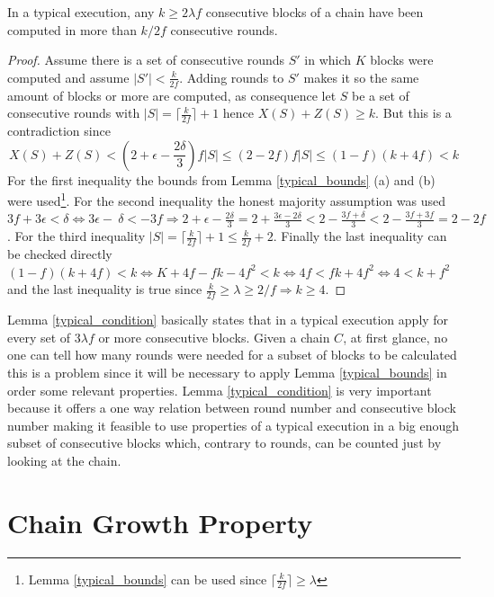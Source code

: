 \documentclass[..]{subfiles}
\begin{document}
\begin{lemma}\label{typical_condition}
	In a typical execution, any $k \ge 2 \lambda f$ consecutive blocks of a chain have been computed in more than $k/2f$ consecutive rounds.
\end{lemma}
\begin{proof}
	Assume there is a set of consecutive rounds $S'$ in which $K$ blocks were computed and assume $|S'|<\frac{k}{2f}$. Adding rounds to $S'$ makes it so the same amount of blocks or more are computed, as consequence let $S$ be a set of consecutive rounds with $|S| = \lceil\frac{k}{2f}\rceil + 1$ hence $X(S) + Z(S) \ge k$. But this is a contradiction since
	$$X(S) + Z(S) < (2 + \epsilon - \frac{2\delta}{3}) f|S| \le (2 - 2f)f|S| \le (1-f)(k+4f) < k$$
	For the first inequality the bounds from Lemma \ref{typical_bounds} (a) and (b) were used\footnote{Lemma \ref{typical_bounds} can be used since $\lceil\frac{k}{2f}\rceil \ge \lambda$}. For the second inequality the honest majority assumption was used $3f + 3\epsilon < \delta \Leftrightarrow 3\epsilon -\ \delta < -3f \Longrightarrow 2 + \epsilon - \frac{2\delta}{3} = 2 + \frac{3\epsilon -2\delta}{3} < 2-\frac{3f + \delta}{3} < 2 - \frac{3f + 3f}{3} = 2 - 2f$. For the third inequality $|S| = \lceil\frac{k}{2f}\rceil + 1 \le \frac{k}{2f} + 2$. Finally the last inequality can be checked directly $(1-f)(k+4f) < k \Leftrightarrow K+4f-fk-4f^2 < k \Leftrightarrow 4f < fk + 4f^2 \Leftrightarrow 4 < k + f^2$ and the last inequality is true since $\frac{k}{2f} \ge \lambda \ge 2/f \Rightarrow k \ge 4$.
\end{proof}

\begin{remark}
	\normalfont
	Lemma \ref{typical_condition} basically states that in a typical execution apply for every set of $3\lambda f$ or more consecutive blocks. Given a chain $C$, at first glance, no one can tell how many rounds were needed for a subset of blocks to be calculated this is a problem since it will be necessary to apply Lemma \ref{typical_bounds} in order some relevant properties. Lemma \ref{typical_condition} is very important because it offers a one way relation between round number and consecutive block number making it feasible to use properties of a typical execution in a big enough subset of consecutive blocks which, contrary to rounds, can be counted just by looking at the chain. 
\end{remark}




\section{Chain Growth Property}
\end{document}

